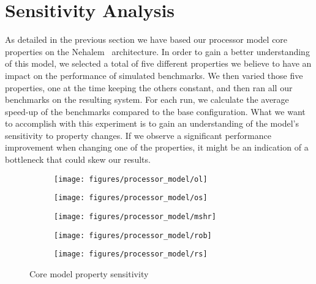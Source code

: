 \section{Sensitivity Analysis}

As detailed in the previous section we have based our processor model core properties on the Nehalem~\cite{Thomadakis2011} architecture.
In order to gain a better understanding of this model, we selected a total of five different properties we believe to have an impact on the performance of simulated benchmarks.
We then varied those five properties, one at the time keeping the others constant, and then ran all our benchmarks on the resulting system. 
For each run, we calculate the average speed-up of the benchmarks compared to the base configuration.
What we want to accomplish with this experiment is to gain an understanding of the model's sensitivity to property changes. 
If we observe a significant performance improvement when changing one of the properties, it might be an indication of a bottleneck that could skew our results.

\begin{figure}[ht]
        \centering
        \begin{subfigure}[b]{0.5\textwidth}
                \texttt{[image: figures/processor\_model/ol]}
                \label{fig:processor_model:sensitivity:ol}
        \end{subfigure}%
        \begin{subfigure}[b]{0.5\textwidth}
                \texttt{[image: figures/processor\_model/os]}
                \label{fig:processor_model:sensitivity:os}
        \end{subfigure}
        \begin{subfigure}[b]{0.5\textwidth}
                \texttt{[image: figures/processor\_model/mshr]}
                \label{fig:processor_model:sensitivity:mshr}
        \end{subfigure}%
        \begin{subfigure}[b]{0.5\textwidth}
                \texttt{[image: figures/processor\_model/rob]}
                \label{fig:processor_model:sensitivity:rob}
        \end{subfigure}
        \begin{subfigure}[b]{0.5\textwidth}
                \texttt{[image: figures/processor\_model/rs]}
                \label{fig:processor_model:sensitivity:rs}
        \end{subfigure}%
        \caption{Core model property sensitivity}\label{fig:processor_model:sensitivity}
\end{figure}

